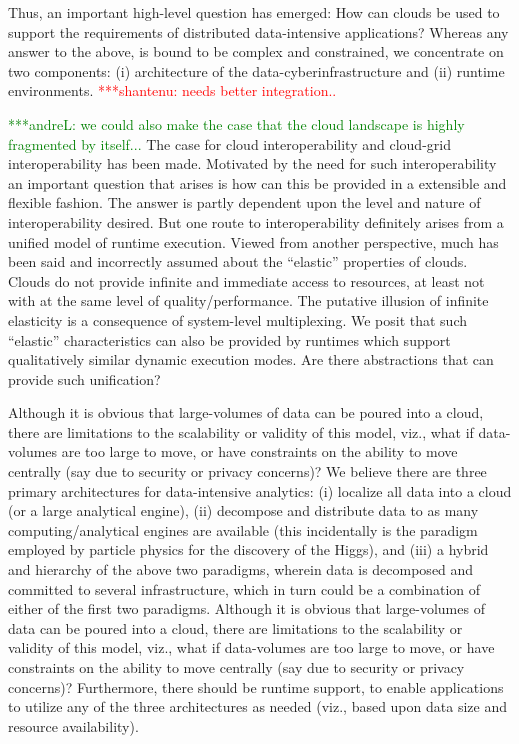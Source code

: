 \documentclass[times]{cpeauth}
\newcommand{\jhanote}[1]{ {\textcolor{red} { ***shantenu: #1 }}}
\newcommand{\alnote}[1]{ {\textcolor{green} { ***andreL: #1 }}}
\newcommand{\alnote}[1]{}
\newcommand{\jhanote}[1]{}
\begin{document}

Thus, an important high-level question has emerged: How can clouds be
used to support the requirements of distributed data-intensive
applications?  Whereas any answer to the above, is bound to be complex
and constrained, we concentrate on two components: (i) architecture of
the data-cyberinfrastructure and (ii) runtime
environments. \jhanote{needs better integration..}
 
\alnote{we could also make the case that the cloud landscape is highly fragmented by itself...}
The case for cloud interoperability and cloud-grid interoperability
has been made. Motivated by the need for such interoperability an
important question that arises is how can this be provided in a
extensible and flexible fashion. The answer is partly dependent upon
the level and nature of interoperability desired. But one route to
interoperability definitely arises from a unified model of runtime
execution.  Viewed from another perspective, much has been said and
incorrectly assumed about the ``elastic'' properties of clouds. Clouds
do not provide infinite and immediate access to resources, at least
not with at the same level of quality/performance. The putative
illusion of infinite elasticity is a consequence of system-level
multiplexing.  We posit that such ``elastic'' characteristics can also
be provided by
runtimes which support qualitatively similar dynamic execution modes.
Are there abstractions that can provide such unification?

Although it is obvious that large-volumes of data can be poured into a
cloud, there are limitations to the scalability or validity of this
model, viz., what if data-volumes are too large to move, or have
constraints on the ability to move centrally (say due to security or
privacy concerns)?  We believe there are three primary architectures
for data-intensive analytics: (i) localize all data into a cloud (or a
large analytical engine), (ii) decompose and distribute data to as
many computing/analytical engines are available (this incidentally is
the paradigm employed by particle physics for the discovery of the
Higgs), and (iii) a hybrid and hierarchy of the above two paradigms,
wherein data is decomposed and committed to several infrastructure,
which in turn could be a combination of either of the first two
paradigms.  Although it is obvious that large-volumes of data can be
poured into a cloud, there are limitations to the scalability or
validity of this model, viz., what if data-volumes are too large to
move, or have constraints on the ability to move centrally (say due to
security or privacy concerns)?  Furthermore, there should be runtime
support, to enable applications to utilize any of the three
architectures as needed (viz., based upon data size and resource
availability).
\end{document}
